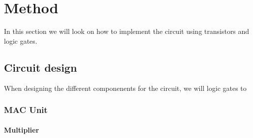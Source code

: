 \section{Method}
\label{sec:method}

In this section we will look on how to implement the circuit using transistors and logic gates. 

\subsection{Circuit design}
\label{subsec:circuitDesign}

When designing the different componenents for the circuit, we will logic gates to 



\subsubsection{MAC Unit}





\paragraph{Multiplier}

